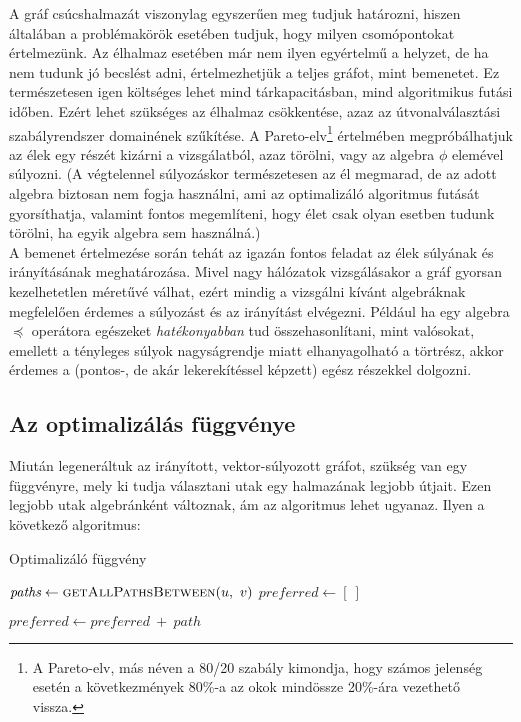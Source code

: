       A gráf csúcshalmazát viszonylag egyszerűen meg tudjuk határozni, hiszen általában a problémakörök esetében tudjuk, hogy milyen csomópontokat értelmezünk. Az élhalmaz esetében már nem ilyen egyértelmű a helyzet, de ha nem tudunk jó becslést adni, értelmezhetjük a teljes gráfot, mint bemenetet. Ez természetesen igen költséges lehet mind tárkapacitásban, mind algoritmikus futási időben. Ezért lehet szükséges az élhalmaz csökkentése, azaz az útvonalválasztási szabályrendszer domainének szűkítése. A Pareto-elv\footnote{A Pareto-elv, más néven a 80/20 szabály kimondja, hogy számos jelenség esetén a következmények 80\%-a az okok mindössze 20\%-ára vezethető vissza.} értelmében megpróbálhatjuk az élek egy részét kizárni a vizsgálatból, azaz törölni, vagy az algebra $\phi$ elemével súlyozni. (A végtelennel súlyozáskor természetesen az él megmarad, de az adott algebra biztosan nem fogja használni, ami az optimalizáló algoritmus futását gyorsíthatja, valamint fontos megemlíteni, hogy élet csak olyan esetben tudunk törölni, ha egyik algebra sem használná.)\\

      A bemenet értelmezése során tehát az igazán fontos feladat az élek súlyának és irányításának meghatározása. Mivel nagy hálózatok vizsgálásakor a gráf gyorsan kezelhetetlen méretűvé válhat, ezért mindig a vizsgálni kívánt algebráknak megfelelően érdemes a súlyozást és az irányítást elvégezni. Például ha egy algebra $\preceq$ operátora egészeket \textit{hatékonyabban} tud összehasonlítani, mint valósokat, emellett a tényleges súlyok nagyságrendje miatt elhanyagolható a törtrész, akkor érdemes a (pontos-, de akár lekerekítéssel képzett) egész részekkel dolgozni.

      \subsection{Az optimalizálás függvénye}
      Miután legeneráltuk az irányított, vektor-súlyozott gráfot, szükség van egy függvényre, mely ki tudja választani utak egy halmazának legjobb útjait. Ezen legjobb utak algebránként változnak, ám az algoritmus lehet ugyanaz. Ilyen a következő algoritmus:

      \begin{algorithm}
        \caption{Optimalizáló függvény}\label{algo_optimalizalo}
        \begin{algorithmic}[1]
            \State $\textit{paths} \gets \Call{getAllPathsBetween}{u,~v}$
            \State $\textit{preferred} \gets [~]$

                \State $\textit{preferred} \gets \textit{preferred}~+~path$
              \EndIf
            \EndFor
          \EndProcedure
        \end{algorithmic}
      \end{algorithm}

